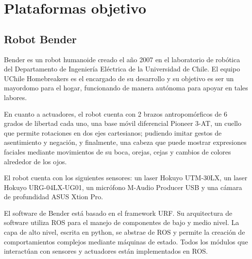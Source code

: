 




\section{Plataformas objetivo}

\subsection{Robot Bender}

Bender es un robot humanoide creado el año 2007 en el laboratorio de robótica del Departamento de Ingeniería Eléctrica de la Universidad de Chile. El equipo UChile Homebreakers es el encargado de su desarrollo y  su objetivo es ser un mayordomo para el hogar, funcionando de manera autónoma para apoyar en tales labores\cite{uchile-robotics}.


En cuanto a actuadores, el robot cuenta con 2 brazos antropomórficos de 6 grados de libertad cada uno, una base móvil diferencial Pioneer 3-AT, un cuello que permite rotaciones en dos ejes cartesianos; pudiendo imitar gestos de asentimiento y negación, y finalmente, una cabeza que puede mostrar expresiones faciales mediante movimientos de su boca, orejas, cejas y cambios de colores alrededor de los ojos.

El robot cuenta con los siguientes sensores: un laser Hokuyo UTM-30LX, un laser Hokuyo URG-04LX-UG01, un micrófono M-Audio Producer USB y una cámara de profundidad ASUS Xtion Pro.

El software de Bender está basado en el framework URF. Su arquitectura de software utiliza  ROS para el manejo de componentes de bajo y medio nivel. La capa de alto nivel, escrita en python, se abstrae de ROS y permite la creación de comportamientos complejos mediante máquinas de estado. Todos los módulos que interactúan con sensores y actuadores están implementados en ROS.



%





